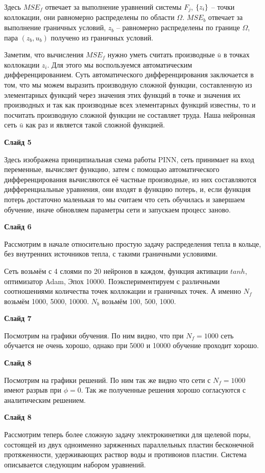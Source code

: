 \documentclass[a4paper,14pt]{extarticle} %
\begin{document}
Здесь $MSE_f$ отвечает за выполнение уравнений системы $F_j$, ${\left\{ z_i \right\}}$ -- точки коллокации, они равномерно распределены по области $\Omega$. $MSE_b$ отвечает за выполнение граничных условий, $z_b$ -- равномерно распределены по границе $\Omega$, пара $(z_b, u_b)$ получено из граничных условий.

Заметим, что вычисления $MSE_f$ нужно уметь считать производные $\bar{u}$ в точках коллокации $z_i$. Для этого мы воспользуемся автоматическим дифференцированием. Суть автоматического дифференцирования заключается в том, что мы можем выразить производную сложной функции, составленную из элементарных функций через значения этих функций в точке и значения их производных и так как производные всех элементарных функций известны, то и посчитать производную сложной функции не составляет труда. Наша нейронная сеть $\bar{u}$ как раз и является такой сложной функцией.

\textbf{Слайд 5}

Здесь изображена принципиальная схема работы PINN, сеть принимает на вход переменные, вычисляет функцию, затем с помощью автоматического дифференцирования вычисляются её частные производные, из них составляются дифференциальные уравнения, они входят в функцию потерь, и, если функция потерь достаточно маленькая то мы считаем что сеть обучилась и завершаем обучение, иначе обновляем параметры сети и запускаем процесс заново.

\textbf{Слайд 6}

Рассмотрим в начале относительно простую задачу распределения тепла в кольце, без внутренних источников тепла, с такими граничными условиями.

Сеть возьмём с 4 слоями по 20 нейронов в каждом, функция активации $tanh$, оптимизатор Adam, Эпох 10000. Поэкспериментируем с различными соотношениями количества точек коллокации и граничных точек. А именно $N_f$ возьмём 1000, 5000, 10000. $N_b$ возьмём 100, 500, 1000.

\textbf{Слайд 7}

Посмотрим на графики обучения. По ним видно, что при $N_f=1000$ сеть обучается не очень хорошо, однако при 5000 и 10000 обучение проходит хорошо.

\textbf{Слайд 8}

Посмотрим на графики решений. По ним так же видно что сети с $N_f = 1000$ имеют разрыв при $\phi = 0$. Так же полученные решения хорошо согласуются с аналитическим решением.

\textbf{Слайд 8}

Рассмотрим теперь более сложную задачу электрокинетики для щелевой поры, состоящей из двух одноименно заряженных параллельных пластин бесконечной протяженности, удерживающих раствор воды и противоиов пластин. Система описывается следующим набором уравнений.
\end{document}

